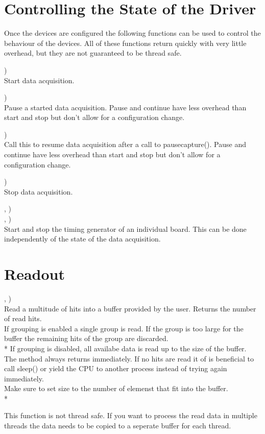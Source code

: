 	\section{Controlling the State of the Driver}
	Once the devices are configured the following functions can be used to control the behaviour of the devices. 
	All of these functions return quickly with very little overhead, but they are not guaranteed to be thread safe.

		\device)\\
		Start data acquisition.\par

		\device)\\
		Pause a started data acquisition. 
		Pause and continue have less overhead than start and stop but don't allow for a configuration change.\par

		\device)\\
		Call this to resume data acquisition after a call to \textsf{\prefix pause\tu capture()}.
		Pause and continue have less overhead than start and stop but don't allow for a configuration change.\par

		\device)\\
		Stop data acquisition.\par

		\device, )\\
		\device, )\\
		Start and stop the timing generator of an individual board. 
		This can be done independently of the state of the data acquisition.\par	


\section{Readout}

\device,    )\\
Read a multitude of hits into a buffer provided by the user. Returns the number of read hits.\\
If grouping is enabled a single group is read. 
If the group is too large for the buffer the remaining hits of the group are discarded.\\*
If grouping is disabled, all availabe data is read up to the size of the buffer. \\
The method always returns immediately. If no hits are read it of is beneficial to call \textsf{sleep()} 
or yield the CPU to another process instead of trying again immediately.\\
Make sure to set \textsf{size} to the number of elemenst that fit into the buffer.\\*

This function is not thread safe. 
If you want to process the read data in multiple threads the data needs to be copied to a seperate buffer for each thread.





